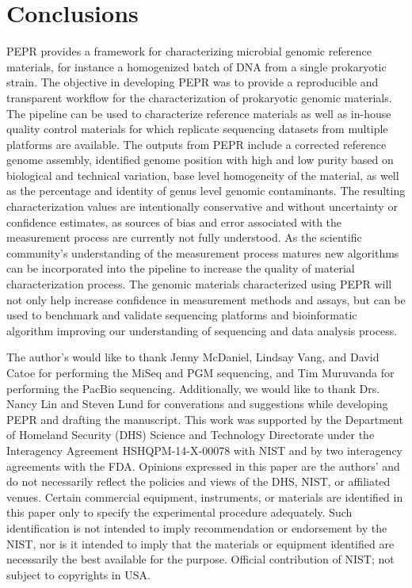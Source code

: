 \documentclass[smallextended]{svjour3}\usepackage[]{graphicx}\usepackage[]{color}
\begin{document}
\section{Conclusions}
PEPR provides a framework for characterizing microbial genomic reference materials, for instance a homogenized batch of DNA from a single prokaryotic strain. The objective in developing PEPR was to provide a reproducible and transparent workflow for the characterization of prokaryotic genomic materials. The pipeline can be used to characterize reference materials as well as in-house quality control materials for which replicate sequencing datasets from multiple platforms are available. The outputs from PEPR include a corrected reference genome assembly, identified genome position with high and low purity based on biological and technical variation, base level homogeneity of the material, as well as the percentage and identity of genus level genomic contaminants. The resulting characterization values are intentionally conservative and without uncertainty or confidence estimates, as sources of bias and error associated with the measurement process are currently not fully understood. As the scientific community's understanding of the measurement process matures new algorithms can be incorporated into the pipeline to increase the quality of material characterization process. The genomic materials characterized using PEPR will not only help increase confidence in measurement methods and assays, but can be used to benchmark and validate sequencing platforms and bioinformatic algorithm improving our understanding of sequencing and data analysis process.


\begin{acknowledgements}
The author’s would like to thank Jenny McDaniel, Lindsay Vang, and David Catoe for performing the MiSeq and PGM sequencing, and Tim Muruvanda for performing the PacBio sequencing. Additionally, we would like to thank Drs. Nancy Lin and Steven Lund for converations and suggestions while developing PEPR and drafting the manuscript. This work was supported by the Department of Homeland Security (DHS) Science and Technology Directorate under the Interagency Agreement HSHQPM-14-X-00078 with NIST and by two interagency agreements with the FDA. Opinions expressed in this paper are the authors’ and do not necessarily reflect the policies and views of the DHS, NIST, or affiliated venues. Certain commercial equipment, instruments, or materials are identified in this paper only to specify the experimental procedure adequately. Such identification is not intended to imply recommendation or endorsement by the NIST, nor is it intended to imply that the materials or equipment identified are necessarily the best available for the purpose.
Official contribution of NIST; not subject to copyrights in USA.
\end{acknowledgements}

\printbibliography
\end{document}
